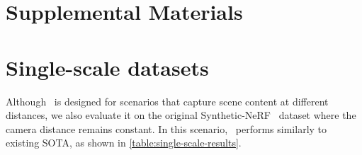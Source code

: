 \clearpage
\appendix

\section*{Supplemental Materials}

\section{Single-scale datasets}

Although \method\ is designed for scenarios that capture scene content at different distances, we also evaluate it on the original Synthetic-NeRF~\cite{mildenhall2020nerf} dataset where the camera distance remains constant. In this scenario, \method\ performs similarly to existing SOTA, as shown in \cref{table:single-scale-results}. 

\begin{table}[H]
\caption{{\bf Single-scale results.} We evaluate \method\ on single-scale Blender~\cite{mildenhall2020nerf}. \method\ performs comparably to existing state-of-the-art.}
\centering
{}
\vspace*{-4mm}
\label{table:single-scale-results}
\end{table}

